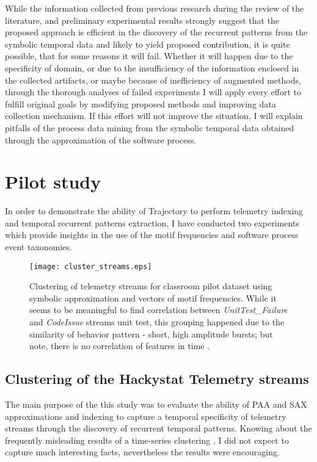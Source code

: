 While the information collected from previous research during the review of the literature, and preliminary experimental results strongly suggest that the proposed approach is efficient in the discovery of the recurrent patterns from the symbolic temporal data and likely to yield proposed contribution, it is quite possible, that for some reasons it will fail. Whether it will happen due to the specificity of domain, or due to the insufficiency of the information enclosed in the collected artifacts, or maybe because of inefficiency of augmented methods, through the thorough analyses of failed experiments I will apply every effort to fulfill original goals by modifying proposed methods and improving data collection mechanism. If this effort will not improve the situation, I will explain pitfalls of the process data mining from the symbolic temporal data obtained through the approximation of the software process. 

\section{Pilot study}\label{pilot.evaluation}
In order to demonstrate the ability of Trajectory to perform telemetry indexing and temporal recurrent patterns extraction, I have conducted two experiments which provide insights in the use of the motif frequencies and software process event taxonomies. 

\begin{figure}[tbp]
   \centering
   \texttt{[image: cluster\_streams.eps]}
   \caption{Clustering of telemetry streams for classroom pilot dataset using symbolic approximation and vectors of motif frequencies. While it seems to be meaningful to find correlation between \textit{UnitTest\_Failure} and \textit{CodeIssue} streams unit test, this grouping happened due to the similarity of behavior pattern - short, high amplitude bursts; but note, there is no correlation of features in time .}
   \label{fig:cluster_streams}
\end{figure}

\subsection{Clustering of the Hackystat Telemetry streams}
The main purpose of the this study was to evaluate the ability of PAA and SAX approximations and indexing to capture a temporal specificity of telemetry streams through the discovery of recurrent temporal patterns. Knowing about the frequently misleading results of a time-series clustering \cite{citeulike:227029}, I did not expect to capture much interesting facts, nevertheless the results were encouraging.

